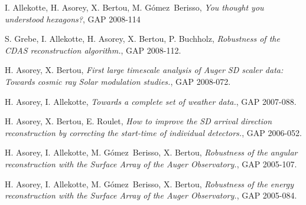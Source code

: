 \begin{etaremune}
\item {}I. Allekotte, H. Asorey, X. Bertou, M. Gómez~Berisso, {\emph{You thought you understood hexagons?}}, GAP 2008-114

\item {}S. Grebe, I. Allekotte, H. Asorey, X. Bertou, P. Buchholz, {\emph{Robustness of the CDAS reconstruction algorithm.}}, GAP 2008-112.

\item {}H. Asorey, X. Bertou, {\emph{First large timescale analysis of Auger SD scaler data: Towards cosmic ray Solar modulation studies.}}, GAP 2008-072.

\item {}H. Asorey, I. Allekotte, {\emph{Towards a complete set of weather data.}}, GAP 2007-088.

\item {}H. Asorey, X. Bertou, E. Roulet, {\emph{How to improve the SD arrival direction reconstruction by correcting the start-time of individual detectors.}}, GAP 2006-052.

\item {}H. Asorey, I. Allekotte, M. Gómez~Berisso, X. Bertou, {\emph{Robustness of the angular reconstruction with the Surface Array of the Auger Observatory.}}, GAP 2005-107.

\item {}H. Asorey, I. Allekotte, M. Gómez~Berisso, X. Bertou, {\emph{Robustness of the energy reconstruction with the Surface Array of the Auger Observatory.}}, GAP 2005-084.
\end{etaremune}
